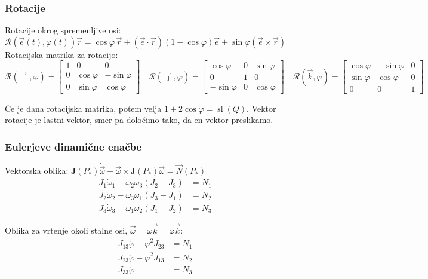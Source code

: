 \documentclass[a4paper,10pt]{article}
\theoremstyle{definition}
\newcommand{\vomega}{\vec{\omega}}
\newcommand{\domega}{\dot{\vomega}}
\newcommand{\vr}{\vec{r}}
\newcommand{\Pt}{P_{\ast}}
\begin{document}
\subsubsection*{Rotacije}
Rotacije okrog spremenljive osi:
$\mathcal R(\vec{e}(t),\varphi(t))\vr = \cos\varphi\,\vr +
(\vec{e}\cdot\vec{r})(1-\cos\varphi)\vec{e} + \sin\varphi(\vec{e} \times \vr)$ \\
Rotacijska matrika za rotacijo: \\
\[
  \mathcal R(\vec{\imath}, \varphi) =
  \begin{bmatrix}
    1 & 0 & 0 \\
    0 & \cos\varphi & -\sin\varphi \\
    0 & \sin\varphi & \cos\varphi
  \end{bmatrix} \quad
  \mathcal R(\vec{\jmath}, \varphi) =
  \begin{bmatrix}
    \cos\varphi & 0 & \sin\varphi  \\
    0           & 1 & 0   \\
    -\sin\varphi & 0 & \cos\varphi
  \end{bmatrix} \quad
  \mathcal R(\vec{k}, \varphi) =
  \begin{bmatrix}
    \cos\varphi & -\sin\varphi & 0 \\
    \sin\varphi & \cos\varphi & 0 \\
    0 & 0 & 1
  \end{bmatrix}
\]

Če je dana rotacijska matrika, potem velja $1 + 2\cos\varphi =
\operatorname{sl}(Q)$. Vektor rotacije je lastni vektor, smer pa določimo tako,
da en vektor preslikamo.

\subsubsection*{Eulerjeve dinamične enačbe}
Vektorska oblika: $\mathbf{J}(\Pt)\domega + \vomega \times \mathbf{J}(\Pt)\vomega =
\vec{N}(\Pt)$
\begin{align*}
  J_1\dot{\omega}_1 - \omega_2\omega_3(J_2 - J_3) &= N_1 \\
  J_2\dot{\omega}_2 - \omega_3\omega_1(J_3 - J_1) &= N_2 \\
  J_3\dot{\omega}_3 - \omega_1\omega_2(J_1 - J_2) &= N_3
\end{align*}

Oblika za vrtenje okoli stalne osi, $\vomega = \omega \vec{k} = \dot{\varphi} \vec{k}$:
\begin{align*}
  J_{13} \ddot{\varphi} - \dot{\varphi}^2 J_{23} &= N_1 \\
  J_{23} \ddot{\varphi} - \dot{\varphi}^2 J_{13} &= N_2 \\
  J_{33} \ddot{\varphi}  &= N_3
\end{align*}
\end{document}
